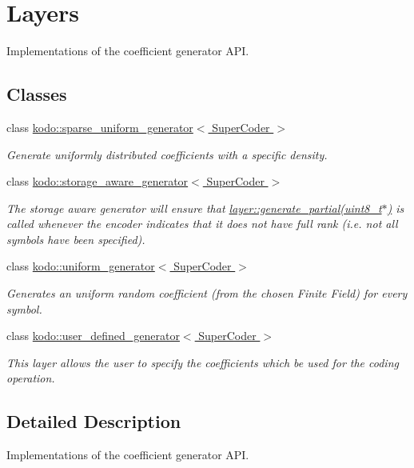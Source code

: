 \hypertarget{group__coefficient__generator__layers}{\section{Layers}
\label{group__coefficient__generator__layers}
}


Implementations of the coefficient generator A\-P\-I.  


\subsection*{Classes}
\begin{DoxyCompactItemize}
\item 
class \hyperlink{classkodo_1_1sparse__uniform__generator}{kodo\-::sparse\-\_\-uniform\-\_\-generator$<$ Super\-Coder $>$}
\begin{DoxyCompactList}\small\item\em Generate uniformly distributed coefficients with a specific density. \end{DoxyCompactList}\item 
class \hyperlink{classkodo_1_1storage__aware__generator}{kodo\-::storage\-\_\-aware\-\_\-generator$<$ Super\-Coder $>$}
\begin{DoxyCompactList}\small\item\em The storage aware generator will ensure that \hyperlink{group__coefficient__generator__api_ga295e2fc5a74a92ef2281549a31379ba5}{layer\-::generate\-\_\-partial(uint8\-\_\-t$\ast$)} is called whenever the encoder indicates that it does not have full rank (i.\-e. not all symbols have been specified). \end{DoxyCompactList}\item 
class \hyperlink{classkodo_1_1uniform__generator}{kodo\-::uniform\-\_\-generator$<$ Super\-Coder $>$}
\begin{DoxyCompactList}\small\item\em Generates an uniform random coefficient (from the chosen Finite Field) for every symbol. \end{DoxyCompactList}\item 
class \hyperlink{classkodo_1_1user__defined__generator}{kodo\-::user\-\_\-defined\-\_\-generator$<$ Super\-Coder $>$}
\begin{DoxyCompactList}\small\item\em This layer allows the user to specify the coefficients which be used for the coding operation. \end{DoxyCompactList}\end{DoxyCompactItemize}


\subsection{Detailed Description}
Implementations of the coefficient generator A\-P\-I. 